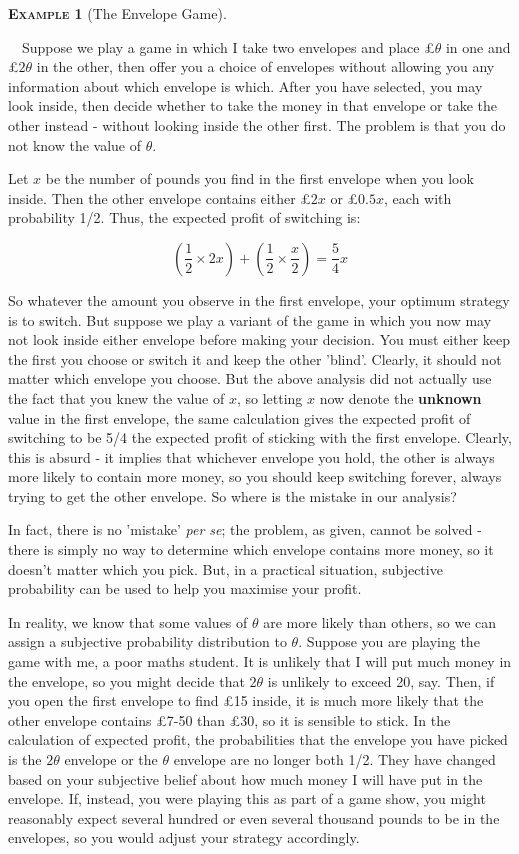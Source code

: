 \documentclass[12pt,a4paper]{article}
\newtheorem{example}{\textsc{Example}}[section]
\begin{document}
\begin{example}[The Envelope Game]\label{envelope}
\end{example}
$\quad$Suppose we play a game in which I take two envelopes and place \pounds$\theta$ in one and \pounds$2\theta$ in the other, then offer you a choice of envelopes without allowing you any information about which envelope is which. After you have selected, you may look inside, then decide whether to take the money in that envelope or take the other instead - without looking inside the other first. The problem is that you do not know the value of $\theta$.

Let $x$ be the number of pounds you find in the first envelope when you look inside. Then the other envelope contains either \pounds$2x$ or \pounds$0.5x$, each with probability 1/2. Thus, the expected profit of switching is:

$$\left(\frac{1}{2}\times 2x\right) + \left(\frac{1}{2} \times \frac{x}{2}\right) = \frac{5}{4}x$$

\indent So whatever the amount you observe in the first envelope, your optimum strategy is to switch. But suppose we play a variant of the game in which you now may not look inside either envelope before making your decision. You must either keep the first you choose or switch it and keep the other 'blind'. Clearly, it should not matter which envelope you choose. But the above analysis did not actually use the fact that you knew the value of $x$, so letting $x$ now denote the {\bf unknown} value in the first envelope, the same calculation gives the expected profit of switching to be 5/4 the expected profit of sticking with the first envelope. Clearly, this is absurd - it implies that whichever envelope you hold, the other is always more likely to contain more money, so you should keep switching forever, always trying to get the other envelope. So where is the mistake in our analysis?

In fact, there is no 'mistake' {\it per se}; the problem, as given, cannot be solved - there is simply no way to determine which envelope contains more money, so it doesn't matter which you pick. But, in a practical situation, subjective probability can be used to help you maximise your profit.

In reality, we know that some values of $\theta$ are more likely than others, so we can assign a subjective probability distribution to $\theta$. Suppose you are playing the game with me, a poor maths student. It is unlikely that I will put much money in the envelope, so you might decide that $2 \theta$ is unlikely to exceed 20, say. Then, if you open the first envelope to find \pounds 15 inside, it is much more likely that the other envelope contains \pounds 7-50 than \pounds 30, so it is sensible to stick. In the calculation of expected profit, the probabilities that the envelope you have picked is the $2\theta$ envelope or the $\theta$ envelope are no longer both 1/2. They have changed based on your subjective belief about how much money I will have put in the envelope. If, instead, you were playing this as part of a game show, you might reasonably expect several hundred or even several thousand pounds to be in the envelopes, so you would adjust your strategy accordingly.
\end{document}
